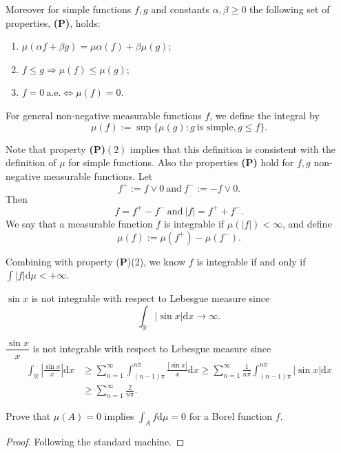 \documentclass[11pt,singlecolumn, openany, citestyle=authoryear]{elegantbook}
\begin{document}
\begin{CJK}{UTF8}{gbsn}
Moreover for simple functions $f, g$ and constants $\alpha, \beta \geq 0$ the 
following set of properties,
\textbf{(P)}, holds:
\begin{enumerate}
    \item {$\mu(\alpha f + \beta g) = \mu \alpha(f) + \beta \mu(g)$;}
    \item {$f \leq g \Longrightarrow \mu(f) \leq \mu(g)$;}
    \item {$f = 0 \ \text{a.e.} \iff \mu(f) = 0$.}
\end{enumerate}

\begin{definition} 
    For general non-negative measurable functions $f$, we define the integral by
    $$
    \mu(f):= \sup\{\mu(g): g \ \text{is simple}, g \leq f\}.
    $$
\end{definition}
Note that property \textbf{(P)}$(2)$ implies that this definition is consistent 
with the definition of $\mu$ for simple functions. 
Also the properties \textbf{(P)} hold for $f, g$ non-negative measurable functions.
Let 
$$
f^+ := f\vee 0 \ \text{and} \ f^- := -f \vee 0.
$$
Then
$$
f = f^+ - f^- \ \text{and} \ |f| = f^+ + f^-.
$$
We say that a measurable function $f$ is integrable if $\mu(|f|) < \infty$, and define
$$
\mu(f) := \mu(f^+) - \mu(f^-).
$$
\begin{remark}
    Combining with property (\textbf{P})(2), we know 
    $f$ is integrable if and only if $\displaystyle\int|f|\mathrm{d}\mu<+\infty$.
\end{remark}
\begin{example}
    $\sin x$ is not integrable with respect to Lebesgue measure since 
    $$
    \int_{\mathbb{R}}|\sin x|\mathrm{d}x \to \infty.
    $$
\end{example}
\begin{example}
    $\dfrac{\sin x}{x}$ is not integrable with respect to Lebesgue measure since 
    \begin{align*}
        \int_{\mathbb{R}} \left|\frac{\sin x}{x}\right|\mathrm{d}x &\geqslant  
        \sum_{n=1}^\infty \int_{(n-1)\pi}^{n\pi}\frac{|\sin x|}{x}\mathrm{d}x 
        \geqslant  \sum_{n=1}^\infty \frac{1}{n\pi}\int_{(n-1)\pi}^{n\pi}|\sin x|\mathrm{d}x\\
        &\geqslant \sum_{n=1}^\infty \frac{2}{n\pi}.
    \end{align*}
\end{example}

\begin{exercise}\label{ex:ex1}
    Prove that $\mu(A)=0$ implies $\displaystyle \int_A f\mathrm{d}\mu=0$ for a 
    Borel function $f$.
\end{exercise}
\begin{proof}
    Following the standard machine.
\end{proof}


\end{CJK}
\end{document}
